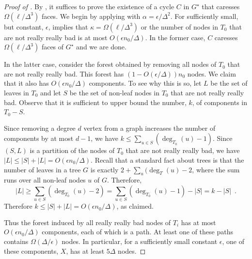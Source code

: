 \documentclass{patmorin}
\newcommand{\dual}[1]{{#1}^\star}
\begin{document}
\begin{proof}[Proof of ]
By , it suffices to prove the existence of a cycle $C$ in $\dual{G}$ that caresses $\Omega(\ell/\Delta^3)$ faces.  We begin by applying  with $\alpha = \epsilon/\Delta^2$.  For sufficiently small, but constant, $\epsilon$,  implies that $\kappa = \Omega(\ell/\Delta^3)$ or the number of nodes in $T_0$ that are not really really bad is at most $O(\epsilon n_0/\Delta)$.  In the former case, $C$ caresses $\Omega(\ell/\Delta^3)$ faces of $\dual{G}$ and we are done.

In the latter case, consider the forest obtained by removing all nodes of $T_0$ that are not really really bad.  This forest has $(1-O(\epsilon/\Delta))n_0$ nodes.  We claim that it also has $O(\epsilon n_0/\Delta)$ components.  To see why this is so, let $L$ be the set of leaves in $T_0$ and let $S$ be the set of non-leaf nodes in $T_0$ that are not really really bad.  Observe that it is sufficient to upper bound the number, $k$, of components in $T_0-S$.

Since removing a degree $d$ vertex from a graph increases the number of components by at most $d-1$, we have $k \le \sum_{u\in S}(\deg_{T_0}(u)-1)$. Since $(S,L)$ is a partition of the nodes of $T_0$ that are not really really bad, we have $|L|\le |S|+|L|=  O(\epsilon n_0/\Delta)$.  Recall that a standard fact about trees is that the number of leaves in a tree $G$ is exactly $2+\sum_{u}(\deg_T(u)-2$, where the sum runs over all non-leaf nodes $u$ of $G$. Therefore,
\[
    |L| \ge \sum_{u\in S}(\deg_{T_0}(u)-2)
     = \sum_{u\in S}(\deg_{T_0}(u)-1) - |S| = k - |S|  \enspace .
\]
Therefore $k\le |S| + |L| = O(\epsilon n_0/\Delta)$, as claimed.

Thus the forest induced by all really really bad nodes of
$T_i$ has at most $O(\epsilon n_0/\Delta)$ components, each of which is
a path.  At least one of these paths contains $\Omega(\Delta/\epsilon)$
nodes. In particular, for a sufficiently small constant $\epsilon$,
one of these components, $X$, has at least $5\Delta$ nodes.



\end{proof}
\end{document}
